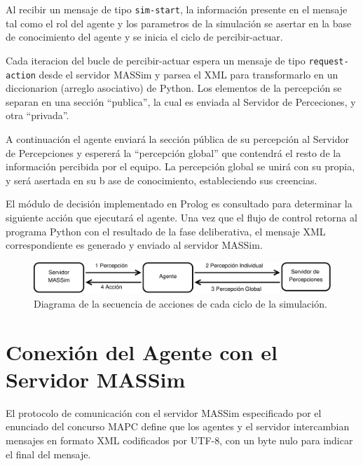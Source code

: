 Al recibir un mensaje de tipo \texttt{sim-start}, la información 
 presente en el mensaje tal como el rol del agente y los parametros
 de la simulación se asertar en la base de conocimiento del agente y 
 se inicia el ciclo de percibir-actuar.

 Cada iteracion del bucle de percibir-actuar espera un mensaje de tipo
 \texttt{request-action} desde el servidor MASSim y parsea el XML para
 transformarlo en un diccionarion (arreglo asociativo) de Python. 
 Los elementos de la percepción se separan en una sección ``publica'', 
 la cual es enviada al Servidor de Perceciones, y otra ``privada''.

 A continuación el agente enviará la sección pública de su percepción 
 al Servidor de Percepciones y espererá la ``percepción global'' que 
 contendrá el resto de la información percibida por el equipo. 
 La percepción global se unirá con su propia, y será asertada en su 
 b ase de conocimiento, estableciendo sus creencias. 

 El módulo de decisión implementado en Prolog es consultado para 
 determinar la siguiente acción que ejecutará el agente. 
 Una vez que el flujo de control retorna al programa Python con el 
 resultado de la fase deliberativa, el mensaje XML correspondiente es 
 generado y enviado al servidor MASSim.   

 \begin{figure}[ht]
 \centering
 \includegraphics[scale=.5]{graficos/eps/system_architecture.eps}
 \caption{Diagrama de la secuencia de acciones de cada ciclo de la simulación.}
 \label{fig:system_architecture}
 \end{figure}

\section[Conexión con el MASSim Server]
 {Conexión del Agente con el Servidor MASSim}
 \label{sec:conexion_massim}

 El protocolo de comunicación con el servidor MASSim especificado por 
 el enunciado del concurso MAPC define que los agentes y el servidor 
 intercambian mensajes en formato XML codificados por UTF-8, con un 
 byte nulo para indicar el final del mensaje. 

